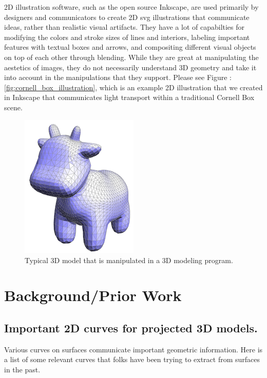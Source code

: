 \documentclass[12pt, letterpaper]{article}
\begin{document}
		2D illustration software, such as the open source Inkscape, are used primarily by designers and communicators to create 2D svg illustrations that
		communicate ideas, rather than realistic visual artifacts. They have a lot of capabilties for modifying the colors and stroke sizes of lines and interiors,
		labeling important features with textual boxes and arrows, and compositing different visual objects on top of each other through blending.
		While they are great at manipulating the aestetics of images, they do not necessarily understand 3D geometry and take it into account in the manipulations
		that they support. Please see Figure : \ref{fig:cornell_box_illustration}, which is an example 2D illustration that we created in Inkscape that communicates light transport within a traditional Cornell Box scene.

		\begin{figure}[h]
		\centering
		\includegraphics[width=0.5\textwidth]{KeenanCow}
		\caption{Typical 3D model that is manipulated in a 3D modeling program.}
		\label{fig:keenan_cow}
		\end{figure}

\newpage

\section{Background/Prior Work}

	\subsection{Important 2D curves for projected 3D models.}

		Various curves on surfaces communicate important geometric information. Here is a list of some relevant curves that folks have been
		trying to extract from surfaces in the past.
\end{document}

